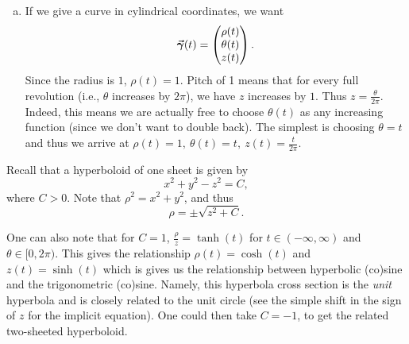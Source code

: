 \documentclass[12pt]{article} %
\begin{document}
\begin{solution}
\begin{enumerate}[(a)]
        \item If we give a curve in cylindrical coordinates, we want
        \[
        \boldsymbol{\vec{\gamma}}(t) = \begin{pmatrix} \rho(t) \\ \theta(t) \\ z(t) \end{pmatrix}.
        \]
        Since the radius is $1$, $\rho(t)=1$.  Pitch of 1 means that for every full revolution (i.e., $\theta$ increases by $2\pi$), we have $z$ increases by $1$. Thus $z=\frac{\theta}{2\pi}$.  Indeed, this means we are actually free to choose $\theta(t)$ as any increasing function (since we don't want to double back). The simplest is choosing $\theta=t$ and thus we arrive at $\rho(t)=1,~\theta(t)=t,~z(t)=\frac{t}{2\pi}$. 
    \end{enumerate}
    
        \item Recall that a hyperboloid of one sheet is given by
        \[
        x^2+y^2-z^2=C,
        \]
        where $C>0$.  Note that $\rho^2=x^2+y^2$, and thus
        \[
        \rho = \pm \sqrt{z^2+C}.
        \]
        
        One can also note that for $C=1$, $\frac{\rho}{z} = \tanh(t)$ for $t\in (-\infty,\infty)$ and $\theta \in [0,2\pi)$.  This gives the relationship $\rho(t)=\cosh(t)$ and $z(t)=\sinh(t)$ which is gives us the relationship between hyperbolic (co)sine and the trigonometric (co)sine. Namely, this hyperbola cross section is the \emph{unit} hyperbola and is closely related to the unit circle (see the simple shift in the sign of $z$ for the implicit equation). One could then take $C=-1$, to get the related two-sheeted hyperboloid.
\end{solution}
\end{document}
